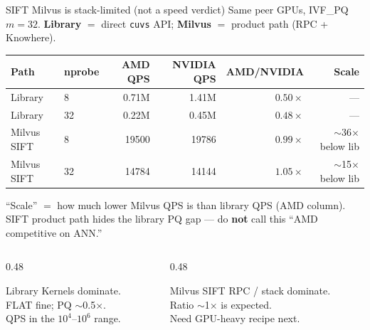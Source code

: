 \documentclass[aspectratio=169,11pt]{beamer}
\begin{document}
\begin{frame}{SIFT Milvus is stack-limited (not a speed verdict)}
  \footnotesize
  Same peer GPUs, IVF\_PQ $m{=}32$. \textbf{Library} $=$ direct \texttt{cuvs} API;
  \textbf{Milvus} $=$ product path (RPC + Knowhere).\\[0.3em]

  \begin{center}
  \begin{tabular}{@{}llrrrr@{}}
    \toprule
    \textbf{Path} & \textbf{nprobe}
      & \textbf{{\color{red}AMD} QPS} & \textbf{{\color{green!60!black}NVIDIA} QPS}
      & \textbf{AMD/NVIDIA} & \textbf{Scale} \\
    \midrule
    Library & 8  & 0.71M & 1.41M & $0.50\times$ & --- \\
    Library & 32 & 0.22M & 0.45M & $0.48\times$ & --- \\
    \midrule
    Milvus SIFT & 8  & 19500 & 19786 & $0.99\times$ & $\sim$36$\times$ below lib \\
    Milvus SIFT & 32 & 14784 & 14144 & $1.05\times$ & $\sim$15$\times$ below lib \\
    \bottomrule
  \end{tabular}
  \end{center}

  \vspace{0.35em}
  {\scriptsize
  ``Scale'' $=$ how much lower Milvus QPS is than library QPS (AMD column).
  SIFT product path hides the library PQ gap --- do \textbf{not} call this
  ``AMD competitive on ANN.''}\\[0.25em]

  \begin{columns}[T]
    \begin{column}{0.48\textwidth}
      \begin{block}{Library}
        \footnotesize
        Kernels dominate.\\
        FLAT fine; PQ $\sim$0.5$\times$.\\
        QPS in the $10^4$--$10^6$ range.
      \end{block}
    \end{column}
    \begin{column}{0.48\textwidth}
      \begin{block}{Milvus SIFT}
        \footnotesize
        RPC / stack dominate.\\
        Ratio $\sim$1$\times$ is expected.\\
        Need GPU-heavy recipe next.
      \end{block}
    \end{column}
  \end{columns}
\end{frame}
\end{document}

